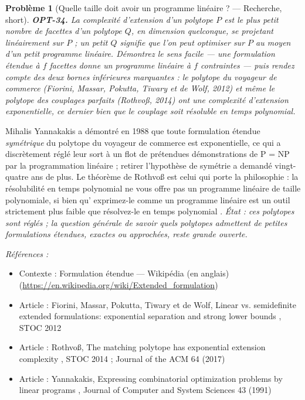 \documentclass[11pt]{article}
\newtheorem{problem}{Problème}
\newenvironment{refs}{\par\small\noindent\emph{Références :}\begin{itemize}\setlength\itemsep{0pt}}{\end{itemize}\normalsize}
\begin{document}
\begin{problem}[{Quelle taille doit avoir un programme linéaire ? --- Recherche, short}]
\textbf{OPT-34.} La \textit{complexité d'extension} d'un polytope $P$ est le
plus petit nombre de facettes d'un polytope $Q$, en dimension quelconque, se projetant
linéairement sur $P$ ; un petit $Q$ signifie que l'on peut optimiser sur $P$ au moyen d'un
petit programme linéaire. Démontrez le sens facile --- une formulation étendue à $f$ facettes
donne un programme linéaire à $f$ contraintes --- puis rendez compte des deux bornes inférieures
marquantes : le polytope du voyageur de commerce (Fiorini, Massar, Pokutta, Tiwary et de Wolf,
2012) et même le polytope des couplages parfaits (Rothvoß, 2014) ont une complexité d'extension
exponentielle, ce dernier bien que le couplage soit résoluble en temps polynomial.
\end{problem}

\noindent Mihalis Yannakakis a démontré en 1988 que toute formulation étendue
\textit{symétrique} du polytope du voyageur de commerce est exponentielle, ce qui a discrètement
réglé leur sort à un flot de prétendues démonstrations de P = NP par la programmation linéaire ;
retirer l'hypothèse de symétrie a demandé vingt-quatre ans de plus. Le théorème de Rothvoß est
celui qui porte la philosophie : la résolubilité en temps polynomial ne vous offre pas un
programme linéaire de taille polynomiale, si bien qu'\og{} exprimez-le comme un programme linéaire \fg{}
est un outil strictement plus faible que \og{} résolvez-le en temps polynomial \fg{}. \textit{État : ces
polytopes sont réglés ; la question générale de savoir quels polytopes admettent de petites
formulations étendues, exactes ou approchées, reste grande ouverte.}

\begin{refs}
\item Contexte : Formulation étendue --- Wikipédia (en anglais) (\url{https://en.wikipedia.org/wiki/Extended_formulation})
\item Article : Fiorini, Massar, Pokutta, Tiwary et de Wolf, \og{} Linear vs. semidefinite extended formulations: exponential separation and strong lower bounds \fg{}, STOC 2012
\item Article : Rothvoß, \og{} The matching polytope has exponential extension complexity \fg{}, STOC 2014 ; Journal of the ACM 64 (2017)
\item Article : Yannakakis, \og{} Expressing combinatorial optimization problems by linear programs \fg{}, Journal of Computer and System Sciences 43 (1991)
\end{refs}
\end{document}
